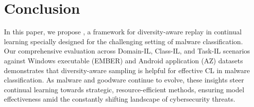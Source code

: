 \section{Conclusion}

In this paper, we propose \system, a framework for diversity-aware replay in continual learning specially designed for the challenging setting of malware classification. Our comprehensive evaluation across Domain-IL, Class-IL, and Task-IL scenarios against Windows executable (EMBER) and Android application (AZ) datasets demonstrates that diversity-aware sampling is helpful for effective CL in malware classification. %
As malware and goodware continue to evolve, these insights steer continual learning towards strategic, resource-efficient methods, ensuring model effectiveness amid the constantly shifting landscape of cybersecurity threats.

